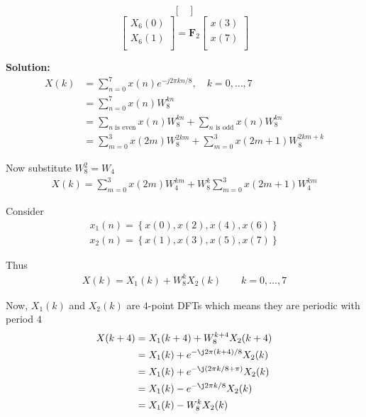 \documentclass[journal,12pt,twocolumn]{IEEEtran}
\newcommand{\solution}{\noindent \textbf{Solution: }}
\providecommand{\cbrak}[1]{\ensuremath{\left\{#1\right\}}}
\let\vec\mathbf
\numberwithin{equation}{section}
\renewcommand\thesection{\arabic{section}}
\begin{document}
\begin{enumerate}[label=\thesection.\arabic*]
\begin{equation}
\begin{bmatrix}
\end{bmatrix}
\end{equation}
\begin{equation}
\begin{bmatrix}
X_{6}(0) \\ 
X_{6}(1)\\ 
\end{bmatrix}
= \vec{F}_{2}
\begin{bmatrix}
x(3) \\ 
x(7) \\ 
\end{bmatrix}
\end{equation}

	\solution 
	\begin{align}
        X(k) &= \sum_{n=0}^7 x(n) e^{-j 2 \pi k n / 8}, \quad k=0, \ldots, 7\\
        &= \sum_{n=0}^7 x(n) W_8^{kn} \\
        &= \sum_{n \text{ is even}}x(n) W_8^{kn} + \sum_{n \text{ is odd}}x(n) W_8^{kn} \\
        &= \sum_{m=0}^3 x(2m) W_8^{2km} + \sum_{m=0}^3 x(2m+1) W_8^{2km + k}
    \end{align}	
    
    Now substitute $W_8^2 = W_4$
    \begin{align}
    		X(k) = \sum_{m=0}^3 x(2m) W_4^{km} + W_8^k \sum_{m=0}^3 x(2m+1) W_4^{km}
    \end{align}
    
    Consider
    \begin{align}
    		x_1(n) = \cbrak{x(0), x(2), x(4), x(6)} \\
    		x_2(n) = \cbrak{x(1), x(3), x(5), x(7)}
    \end{align}
    
    Thus
    \begin{align}
    		X(k) = X_1(k) + W_8^k X_2(k) \qquad k = 0,\ldots,7
    \end{align}
    
    Now, $X_1(k)$ and $X_2(k)$ are $4$-point DFTs which means they are periodic with period $4$
    \begin{align}
    		X(k+4) &= X_1(k+4) + W_8^{k+4} X_2(k+4) \\
    		&= X_1(k) + e^{-\j 2\pi(k+4)/8} X_2(k) \\
    		&= X_1(k) + e^{-\j (2\pi k/8 + \pi)} X_2(k) \\
    		&= X_1(k) - e^{-\j 2\pi k/8 } X_2(k) \\
    		&= X_1(k) - W_8^k X_2(k)
    \end{align}
    

\end{enumerate}
\end{document}
